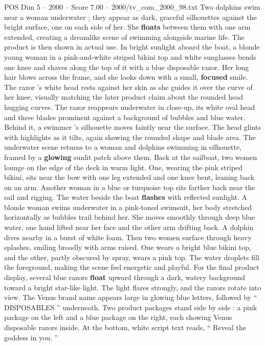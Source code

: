 \begin{textsample}{POS Dim 5 – 2000 – Score 7.00 – 2000/tv\_com\_2000\_98.txt}
Two dolphins swim near a woman underwater ; they appear as dark, graceful silhouettes against the bright surface, one on each side of her.
She \textbf{floats} between them with one arm extended, creating a dreamlike scene of swimming alongside marine life.
The product is then shown in actual use.
In bright sunlight aboard the boat, a blonde young woman in a pink-and-white striped bikini top and white sunglasses bends one knee and shaves along the top of it with a blue disposable razor.
Her long hair blows across the frame, and she looks down with a small, \textbf{focused} smile.
The razor ’s white head rests against her skin as she guides it over the curve of her knee, visually matching the later product claim about the rounded head hugging curves.
The razor reappears underwater in close-up, its white oval head and three blades prominent against a background of bubbles and blue water.
Behind it, a swimmer ’s silhouette moves faintly near the surface.
The head glints with highlights as it tilts, again showing the rounded shape and blade area.
The underwater scene returns to a woman and dolphins swimming in silhouette, framed by a \textbf{glowing} sunlit patch above them.
Back at the sailboat, two women lounge on the edge of the deck in warm light.
One, wearing the pink striped bikini, sits near the bow with one leg extended and one knee bent, leaning back on an arm.
Another woman in a blue or turquoise top sits farther back near the sail and rigging.
The water beside the boat \textbf{flashes} with reflected sunlight.
A blonde woman swims underwater in a pink-toned swimsuit, her body stretched horizontally as bubbles trail behind her.
She moves smoothly through deep blue water, one hand lifted near her face and the other arm drifting back.
A dolphin dives nearby in a burst of white foam.
Then two women surface through heavy splashes, smiling broadly with arms raised.
One wears a bright blue bikini top, and the other, partly obscured by spray, wears a pink top.
The water droplets fill the foreground, making the scene feel energetic and playful.
For the final product display, several blue razors \textbf{float} upward through a dark, watery background toward a bright star-like light.
The light flares strongly, and the razors rotate into view.
The Venus brand name appears large in glowing blue letters, followed by “ DISPOSABLES ” underneath.
Two product packages stand side by side : a pink package on the left and a blue package on the right, each showing Venus disposable razors inside.
At the bottom, white script text reads, “ Reveal the goddess in you. ”

\end{textsample}
